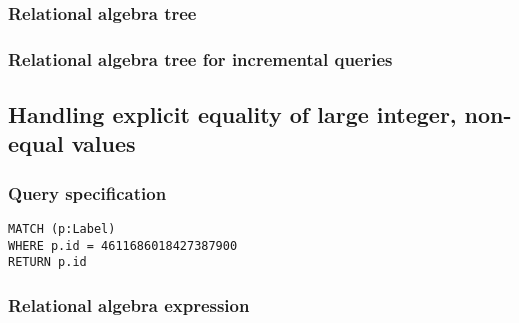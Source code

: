 \subsubsection*{Relational algebra tree}


\subsubsection*{Relational algebra tree for incremental queries}


\subsection{Handling explicit equality of large integer, non-equal values}

\subsubsection*{Query specification}

\begin{lstlisting}
MATCH (p:Label)
WHERE p.id = 4611686018427387900
RETURN p.id
\end{lstlisting}

\subsubsection*{Relational algebra expression}


